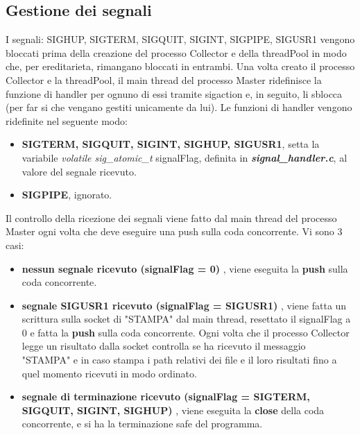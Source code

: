 \documentclass{article}
\begin{document}
\subsection{Gestione dei segnali}
I segnali: SIGHUP, SIGTERM, SIGQUIT, SIGINT, SIGPIPE, SIGUSR1 vengono bloccati prima della creazione del processo Collector e della threadPool in modo che, per ereditarieta, rimangano bloccati in entrambi. Una volta creato il processo Collector e la threadPool, il main thread del processo Master ridefinisce la funzione di handler per ognuno di essi tramite sigaction e, in seguito, li sblocca (per far si che vengano gestiti unicamente da lui). Le funzioni di handler vengono ridefinite nel seguente modo:
\begin{itemize}
    \itemsep 0em
    \item \textbf{SIGTERM, SIGQUIT, SIGINT, SIGHUP, SIGUSR1}, setta la variabile \textit{volatile sig\_atomic\_t} signalFlag, definita in \textit{\textbf{signal\_handler.c}}, al valore del segnale ricevuto.
    \item \textbf{SIGPIPE}, ignorato.
\end{itemize}
Il controllo della ricezione dei segnali viene fatto dal main thread del processo Master ogni volta che deve eseguire una push sulla coda concorrente. Vi sono 3 casi:
\begin{itemize}
    \itemsep 0em
    \item \textbf{nessun segnale ricevuto (signalFlag = 0) }, viene eseguita la \textbf{push} sulla coda concorrente.
    \item \textbf{segnale SIGUSR1 ricevuto (signalFlag = SIGUSR1) }, viene fatta un scrittura sulla socket di "STAMPA" dal main thread, resettato il signalFlag a 0 e fatta la \textbf{push} sulla coda concorrente. Ogni volta che il processo Collector legge un risultato dalla socket controlla se ha ricevuto il messaggio "STAMPA" e in caso stampa i path relativi dei file e il loro risultati fino a quel momento ricevuti in modo ordinato.
    \item \textbf{segnale di terminazione ricevuto (signalFlag = SIGTERM, SIGQUIT, SIGINT, SIGHUP) }, viene eseguita la \textbf{close} della coda concorrente, e si ha la terminazione safe del programma.
\end{itemize}
\end{document}
